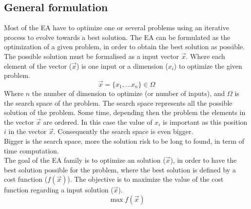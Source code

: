 \subsection{General formulation}\label{sec:GeneralEAform}

 Most of the EA have to optimize one or several problems using an iterative process to evolve towards a best solution. The EA can be formulated as the optimization of a given problem, in order to obtain the best solution as possible. %
 The possible solution  must be formalised as a input vector $\vec{x}$.
  Where each element of the vector ($\vec{x}$) is one  input or a dimension ($x_i$) to optimize the given problem. \begin{equation}
	\vec{x}= \{x_1,...x_n \} \in \Omega
\end{equation}
Where $n$ the number of dimension to optimize (or number of inputs), and $\Omega$ is the search space of the problem. The search space represents all the possible solution of the problem.
Some time, depending then the problem the elements in the vector $\vec{x}$ are ordered. In this case the value of $x_i$ is important as this position $i$ in the vector $\vec{x}$. Consequently the search space is even bigger.%
\\ Bigger is the search space, more the solution risk to be long to found, in term of time computation.\\
 The goal of the EA family is to optimize an solution ($\vec{x}$), in order to have the best solution possible for the problem, where the best solution is defined by a cost function ($f(\vec{x})$). The objective is to maximize the value of the cost function regarding a input solution ($\vec{x}$). 
 \begin{equation}
	\max f(\vec{x})
\end{equation}
 
